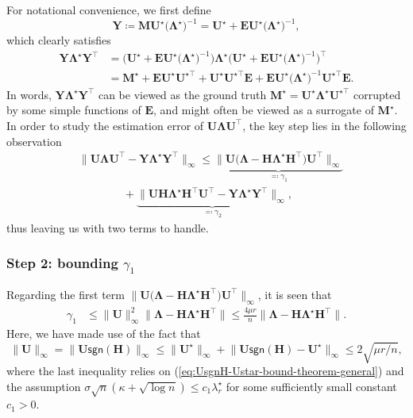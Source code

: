 For notational convenience, we first define
\begin{equation}
\bm{Y}\coloneqq\bm{M}\bm{U}^{\star}\big(\bm{\Lambda}^{\star}\big)^{-1}=\bm{U}^{\star}+\bm{E}\bm{U}^{\star}\big(\bm{\Lambda}^{\star}\big)^{-1},\label{eq:defn-Y-MULambda}
\end{equation}
which clearly satisfies
\begin{align*}
\bm{Y}\bm{\Lambda}^{\star}\bm{Y}^{\top} & =\Big(\bm{U}^{\star}+\bm{E}\bm{U}^{\star}\big(\bm{\Lambda}^{\star}\big)^{-1}\Big)\bm{\Lambda}^{\star}\Big(\bm{U}^{\star}+\bm{E}\bm{U}^{\star}\big(\bm{\Lambda}^{\star}\big)^{-1}\Big)^{\top}\\
 & =\bm{M}^{\star}+\bm{E}\bm{U}^{\star}\bm{U}^{\star\top}+\bm{U}^{\star}\bm{U}^{\star\top}\bm{E}+\bm{E}\bm{U}^{\star}\big(\bm{\Lambda}^{\star}\big)^{-1}\bm{U}^{\star\top}\bm{E}.
\end{align*}
In words, $\bm{Y}\bm{\Lambda}^{\star}\bm{Y}^{\top}$ can be viewed
as the ground truth $\bm{M}^{\star}=\bm{U}^{\star}\bm{\Lambda}^{\star}\bm{U}^{\star\top}$
corrupted by some simple functions of $\bm{E}$, and might often be
viewed as a surrogate of $\bm{M}^{\star}$. In order to study the
estimation error of $\bm{U}\bm{\Lambda}\bm{U}^{\top}$, the key step
lies in the following observation
%
\begin{align}
 & \big\|\bm{U}\bm{\Lambda}\bm{U}^{\top}-\bm{Y}\bm{\Lambda}^{\star}\bm{Y}^{\top}\big\|_{\infty}\leq\underset{\eqqcolon\mathcal{\gamma}_{1}}{\underbrace{\big\|\bm{U}\big(\bm{\Lambda}-\bm{H}\bm{\Lambda}^{\star}\bm{H}^{\top}\big)\bm{U}^{\top}\big\|_{\infty}}}\nonumber \\
 & \quad\quad\quad\quad+
	\underset{\eqqcolon\gamma_{2}}{\underbrace{\big\|\bm{U}\bm{H}\bm{\Lambda}^{\star}\bm{H}^{\top}\bm{U}^{\top}-\bm{Y}\bm{\Lambda}^{\star}\bm{Y}^{\top}\big\|_{\infty}}},
\label{eq:ULambdaU-YLambdaY-decompose}
\end{align}
%
thus leaving us with two terms to handle. 





\subsubsection{Step 2: bounding $\gamma_1$}

Regarding the first term $\big\|\bm{U}\big(\bm{\Lambda}-\bm{H}\bm{\Lambda}^{\star}\bm{H}^{\top}\big)\bm{U}^{\top}\big\|_{\infty}$,
it is seen that
%
\begin{align}
\gamma_{1} & \leq\big\|\bm{U}\big\|_{\infty}^{2}\big\|\bm{\Lambda}-\bm{H}\bm{\Lambda}^{\star}\bm{H}^{\top}\big\|\leq\frac{4\mu r}{n}\big\|\bm{\Lambda}-\bm{H}\bm{\Lambda}^{\star}\bm{H}^{\top}\big\|.
	\label{eq:gamma1-UB-12345}
\end{align}
%
Here, we have made use of the fact that
\[
\big\|\bm{U}\big\|_{\infty}=\big\|\bm{U}\mathsf{sgn}(\bm{H})\big\|_{\infty}\leq\big\|\bm{U}^{\star}\big\|_{\infty}+\big\|\bm{U}\mathsf{sgn}(\bm{H})-\bm{U}^{\star}\big\|_{\infty}\leq2\sqrt{\mu r/n},
\]
where the last inequality relies on (\ref{eq:UsgnH-Ustar-bound-theorem-general})
and the assumption $\sigma\sqrt{n}(\kappa+\sqrt{\log n})\leq c_{1}\lambda_{r}^{\star}$
for some sufficiently small constant $c_{1}>0$. 





